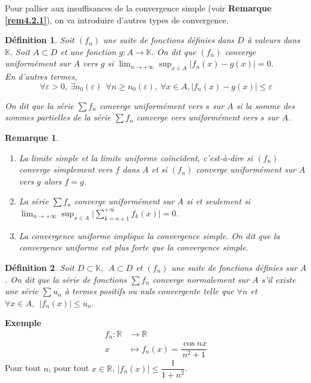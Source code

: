 \documentclass[11pt, a4paper]{book}
\newtheorem{defi}{D\'efinition}[section]
\newtheorem{rem}{Remarque}[section]
\begin{document}
Pour pallier aux insuffisances de la convergence simple (voir \textbf{Remarque \ref{rem4.2.1}}), on va introduire d'autres types de convergence.
\begin{defi} Soit $(f_n)$ une suite de fonctions d\'efinies dans $D$ \`a valeurs dans $ \mathbb{K}.$ Soit $A \subset D$ et une fonction $g:A\longrightarrow \mathbb{K}.$ On dit que $(f_n)$ converge uniform\'ement sur $A$ vers $g$ si ${\displaystyle \lim_{n\rightarrow+\infty} \sup_{x\in A}|f_n(x)-g(x)|=0.}$\\
En d'autres termes, 
$$ \forall \varepsilon >0,~\exists n_0(\varepsilon)~~\forall n\geq n_0(\varepsilon),~\forall x\in A, |f_n(x)-g(x)|\leq\varepsilon$$

On dit que la s\'erie $\sum f_n$ converge uniform\'ement vers $s$ sur $A$ si la somme des sommes partielles de la s\'erie $\sum f_n$ converge vers uniform\'ement vers $s$ sur $A$.
\end{defi}
\begin{rem} \label{rem4.2.2}   \begin{enumerate}
\item[i-] La limite simple et la limite uniforme co\"{i}ncident, c'est-\`a-dire si $(f_n)$ converge simplement vers $f$ dans $A$ et si $(f_n)$ converge uniform\'ement sur $A$ vers $g$ alors $f=g$.
\item[ii-] La s\'erie $\sum f_n$ converge uniform\'ement sur $A$ si et seulement si ${\displaystyle \lim_{n\rightarrow+\infty} \sup_{x\in A} \Big|\sum_{k=n+1}^{+\infty} f_k(x)\Big|=0}$.
\item[iii-] La convergence uniforme implique la convergence simple. On dit que la convergence uniforme est plus forte que la convergence simple.
\end{enumerate}
\end{rem}
\begin{defi} Soit $D \subset \mathbb{K},~~A \subset D$ et $(f_n)$ une suite de fonctions d\'efinies sur $A$. On dit que la s\'erie de fonctions $\sum f_n$ converge normalement sur $A$ s'il existe une s\'erie $\sum u_n$ \`a termes positifs ou nuls convergente telle que $\forall n$ et $\forall x\in A,~~|f_n(x)|\leq u_n.$ 
\end{defi}
\textbf{Exemple}\quad
\begin{align*} f_n: \mathbb{R}& \longrightarrow \mathbb{R}\\ x& \longmapsto f_n(x)=\dfrac{\cos nx}{n^2+1} \end{align*} 
Pour tout $n$, pour tout $x\in \mathbb{R}$, $|f_n(x)|\leq \dfrac{1}{1+n^2}$.\\
\end{document}
